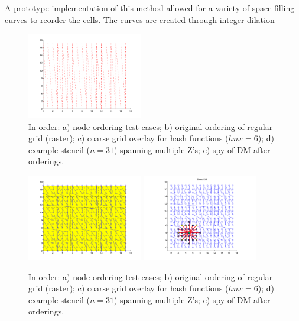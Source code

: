 \documentclass[11pt]{report}
\begin{document}
{A prototype implementation of this method allowed for a variety of space filling curves to reorder the cells. The curves are created through integer dilation \cite{IntegerD} 


\begin{figure}
\centering
\includegraphics[width=0.45\textwidth]{rbffd_methods_content/hashing/originalorder_regulargrid-eps-converted-to.pdf}
\caption{In order: a) node ordering test cases; b) original ordering of regular grid (raster); c) coarse grid overlay for hash functions ($hnx = 6$); d) example stencil ($n=31$) spanning multiple Z's; e) spy of DM after orderings. }
\label{fig:orderings}
\end{figure}

\begin{figure}
\centering
\includegraphics[width=0.45\textwidth]{rbffd_methods_content/hashing/overlay_regulargrid-eps-converted-to.pdf} \includegraphics[width=0.45\textwidth]{rbffd_methods_content/hashing/stencil_regulargrid-eps-converted-to.pdf}
\caption{In order: a) node ordering test cases; b) original ordering of regular grid (raster); c) coarse grid overlay for hash functions ($hnx = 6$); d) example stencil ($n=31$) spanning multiple Z's; e) spy of DM after orderings. }
\label{fig:orderings}
\end{figure}

}
\end{document}
